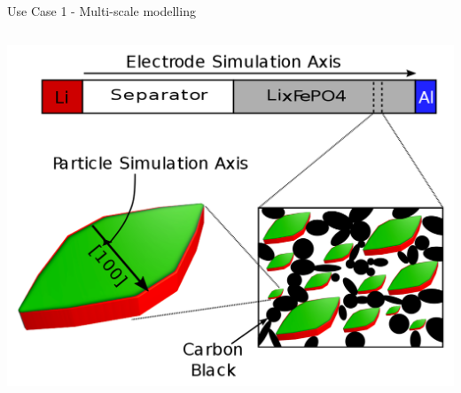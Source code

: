 \documentclass[compress,newPxFont,sthlmFooter]{beamer}
\begin{document}
\begin{frame}[plain]{Use Case 1 - Multi-scale modelling}
\begin{columns}[c]
      \begin{column}{0.4\textwidth}
        \begin{center}
          \includegraphics[align=c, width=\textwidth]{multi_scale.png}
        \end{center}
      \end{column}
    \end{columns}
\end{frame}
\end{document}
